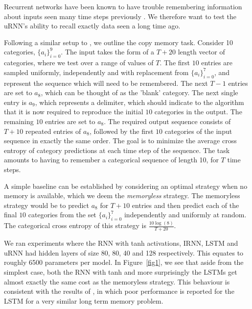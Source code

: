 \documentclass{article} %
\begin{document}
Recurrent networks have been known to have trouble remembering information about inputs seen
many time steps previously \citep{Yoshua94, Pascanu2013}. 
We therefore want to test the uRNN's ability to recall exactly data seen a long time ago.

Following a similar setup to \cite{LSTM}, we outline the copy memory task.
Consider 10 categories, $\{ a_i \}_{i=0}^9$.   
The input takes the form of a $T+20$ length vector of categories, where we test over a range of values
of $T$. 
The first $10$ entries are sampled uniformly, independently and with replacement from $\{a_i\}_{i=0}^7$,
and represent the sequence which will need to be remembered. 
The next $T-1$ entries are set to $a_8$, which can be thought of as the 'blank' category. 
The next single entry is $a_9$, which represents a delimiter, which should indicate to the algorithm
that it is now required to reproduce the initial $10$ categories in the output. 
The remaining $10$ entries are set to $a_8$. The required output sequence consists of $T+10$ 
repeated entries of $a_8$, followed by the first $10$ categories of the input sequence in exactly the
same order. The goal is to minimize the average cross entropy of category predictions 
at each time step of the sequence.
The task amounts to having to remember a categorical sequence of length 10, for $T$ time steps.

A simple baseline can be established by considering an optimal strategy when no memory is available, 
which we deem the \textit{memoryless} strategy. The memoryless strategy would be to predict $a_8$ for 
$T+10$ entries and then predict each of the final $10$ categories from the set $\{a_i\}_{i=0}^7$ independently
and uniformly at random. The categorical cross entropy of this strategy is $\frac{10 \log(8) }{T+20}$. 

We ran experiments where the RNN with tanh activations, IRNN, LSTM and uRNN had hidden layers of size 
80, 80, 40 and 128 respectively. This equates to roughly 6500 parameters per model. 
In Figure~\ref{fig1}, we see that aside from the simplest case, both the RNN with tanh and more surprisingly 
the LSTMs get almost exactly the same cost as the memoryless strategy. This behaviour is consistent 
with the results of \cite{NTM}, in which poor performance is reported for the LSTM for a very similar 
long term memory problem.
\end{document}
